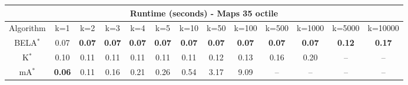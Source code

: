 \begin{tabular}{c|cccccccccccc}\toprule
\multicolumn{13}{c}{Runtime (seconds) - Maps 35 octile}\\ \midrule
Algorithm & k=1 & k=2 & k=3 & k=4 & k=5 & k=10 & k=50 & k=100 & k=500 & k=1000 & k=5000 & k=10000 \\ \midrule
BELA$^*$ & 0.07 & \textbf{0.07} & \textbf{0.07} & \textbf{0.07} & \textbf{0.07} & \textbf{0.07} & \textbf{0.07} & \textbf{0.07} & \textbf{0.07} & \textbf{0.07} & \textbf{0.12} & \textbf{0.17} \\
K$^*$ & 0.10 & 0.11 & 0.11 & 0.11 & 0.11 & 0.11 & 0.12 & 0.13 & 0.16 & 0.20 & -- & -- \\
mA$^*$ & \textbf{0.06} & 0.11 & 0.16 & 0.21 & 0.26 & 0.54 & 3.17 & 9.09 & -- & -- & -- & -- \\ \bottomrule 
\end{tabular}
